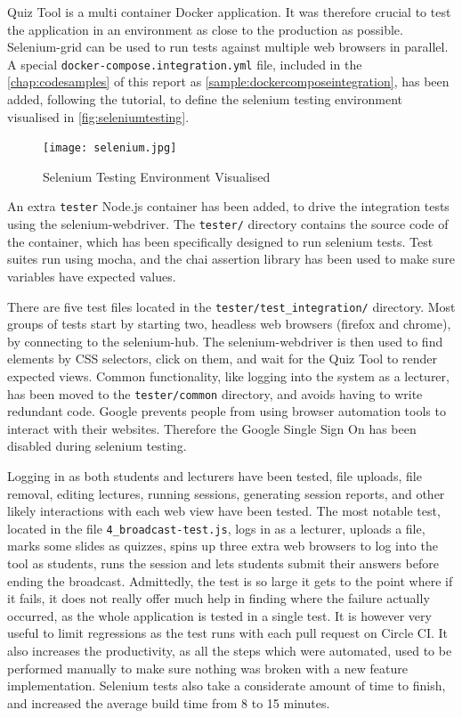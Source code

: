 Quiz Tool is a multi container Docker application. It was therefore crucial to test
the application in an environment as close to the production as possible.
Selenium-grid\cite{67} can be used to run tests against multiple web browsers in
parallel. A special \texttt{docker-compose.integration.yml} file, included in the
\autoref{chap:codesamples} of this report as \autoref{sample:dockercomposeintegration},
has been added, following the tutorial\cite{68}, to define the selenium testing
environment visualised in \autoref{fig:seleniumtesting}.

\begin{figure}[h!]
    \centering
    \texttt{[image: selenium.jpg]}
    \caption{Selenium Testing Environment Visualised}
    \label{fig:seleniumtesting}
\end{figure}

An extra \texttt{tester} Node.js container has been added, to drive the integration
tests using the selenium-webdriver\cite{69}. The \texttt{tester/} directory contains
the source code of the container, which has been specifically designed to run
selenium tests. Test suites run using mocha, and the chai assertion library has been
used to make sure variables have expected values.

There are five test files
located in the \texttt{tester/test\_integration/} directory. Most groups of
tests start by starting two, headless web browsers (firefox and chrome), by
connecting to the selenium-hub. The selenium-webdriver is then used to
find elements by CSS selectors, click on them, and wait for the Quiz
Tool to render expected views. Common functionality, like logging into the
system as a lecturer, has been moved to the \texttt{tester/common} directory,
and avoids having to write redundant code. Google prevents people from using
browser automation tools to interact with their websites. Therefore the Google
Single Sign On has been disabled during selenium testing.

\newpage
Logging in as both students and lecturers have been tested, file uploads,
file removal, editing lectures, running sessions, generating session
reports, and other likely interactions with each web view have been tested.
The most notable test, located in the file \texttt{4\_broadcast-test.js}, logs
in as a lecturer, uploads a file, marks some slides as quizzes, spins up
three extra web browsers to log into the tool as students, runs the session
and lets students submit their answers before ending the broadcast. Admittedly, the test
is so large it gets to the point where if it fails, it does not really offer
much help in finding where the failure actually occurred, as the whole application
is tested in a single test. It is however very useful to limit regressions
as the test runs with each pull request on Circle CI. It also increases
the productivity, as all the steps which were automated, used to be performed
manually to make sure nothing was broken with a new feature implementation.
Selenium tests also take a considerate amount of time to finish, and increased
the average build time from 8 to 15 minutes.

